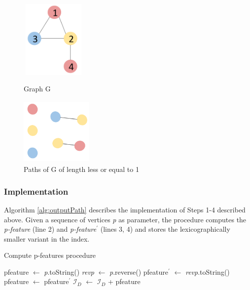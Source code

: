 \documentclass{l4proj}
\newcommand{\fancyI}{\mathcal{I}}
\begin{document}
\begin{figure}
\centering
\begin{minipage}[t]{.4\textwidth}
  \centering
  \includegraphics[height=3.8cm,width=3.2cm]{images/graphs/graph.png}
  \caption{Graph G}
  \label{C2H4-1}
\end{minipage}
\begin{minipage}[t]{.4\textwidth}
  \centering
  \includegraphics[height=3.3cm,width=3.5cm]{images/features.png}
  \caption{Paths of G of length less or equal to 1}
  \label{features}
\end{minipage}
\end{figure}

\subsubsection{Implementation}
\label{pi:featuresImpl}
Algorithm \ref{alg:outputPath} describes the implementation of Steps 1-4 described above. Given a sequence of vertices \emph{p} as parameter, the procedure computes the \emph{p-feature} (line 2) and \emph{p-feature}$^{\prime}$ (lines 3, 4) and stores the lexicographically smaller variant in the index.

\begin{algorithm}
\centering
\caption{Compute p-features procedure}
\label{alg:outputPath}
\begin{algorithmic}[1]
\State pfeature $\gets$ \emph{p}.toString() 
\State \emph{revp} $\gets$ \emph{p}.reverse() 
\State pfeature$^{\prime}$ $\gets$ \emph{revp}.toString() 
\State pfeature $\gets$ pfeature$^{\prime}$ 
\EndIf
\If {pfeature $\notin$ $\fancyI_{D}$}
\State $\fancyI_{D}$ $\gets$ $\fancyI_{D}$ + pfeature %
\EndIf
\EndProcedure
\end{algorithmic}
\end{algorithm}
\end{document}
